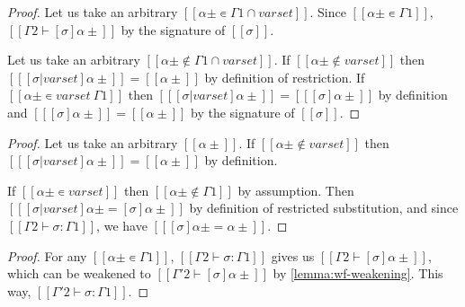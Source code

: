 \lemmaSubstRestrSig*
\begin{proof}
  Let us take an arbitrary $[[α± ∊ Γ1 ∩ varset]]$.
  Since $[[α± ∊ Γ1]]$, $[[Γ2 ⊢ [σ]α± ]]$ by the signature of $[[σ]]$.

  Let us take an arbitrary $[[α± ∉ Γ1 ∩ varset]]$.
  If $[[α± ∉ varset]]$ then $[[ [σ|varset]α± ]] = [[α±]]$ by definition
  of restriction. 
  If $[[α± ∊ varset \ Γ1]]$ then $[[ [σ|varset]α± ]] = [[ [σ]α± ]]$ by definition
  and $[[ [σ]α± ]] = [[α±]]$ by the signature of $[[σ]]$.
\end{proof}

\lemmaSubstDisjoint*
\begin{proof}
  Let us take an arbitrary $[[α±]]$.
  If $[[α± ∉ varset]]$ then $[[ [σ|varset]α±]] = [[α±]]$ by definition.

  If $[[α± ∊ varset]]$ then $[[α± ∉ Γ1]]$ by assumption.
  Then $[[ [σ|varset]α± = [σ]α±]]$ by definition of restricted substitution, and
  since $[[Γ2 ⊢ σ : Γ1]]$, we have $[[ [σ]α± = α± ]]$.
\end{proof}

\corollarySubstDisj*

\lemmaSubstRangeWeak*
\begin{proof}
  For any $[[α± ∊ Γ1]]$, 
  $[[Γ2 ⊢ σ : Γ1]]$ gives us  $[[ Γ2 ⊢ [σ]α± ]]$, which can be
  weakened to $[[ Γ'2 ⊢ [σ]α± ]]$ by \cref{lemma:wf-weakening}. 
  This way, $[[Γ'2 ⊢ σ : Γ1]]$.
\end{proof}

